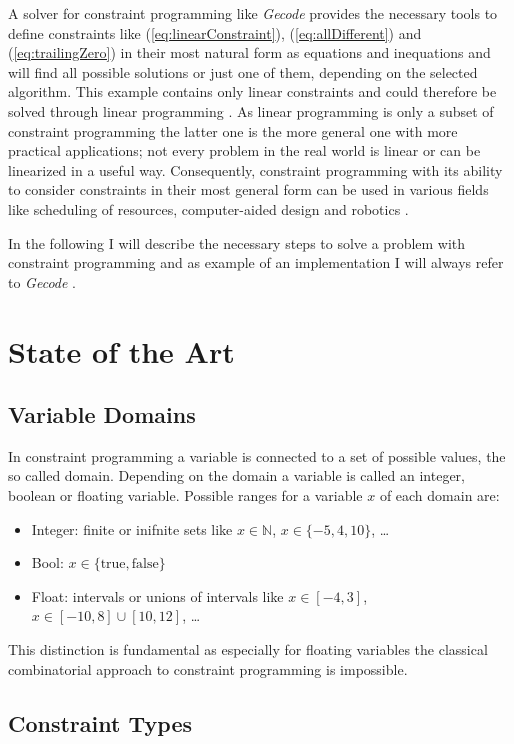 \documentclass[10pt,
               a4paper,
               journal,
               ]{IEEEtran}
\newcommand{\refeq}[1]{{(\ref{#1})}}
\begin{document}
	A solver for constraint programming like \emph{Gecode} provides the necessary tools to define constraints like \refeq{eq:linearConstraint}, \refeq{eq:allDifferent} and \refeq{eq:trailingZero} in their most natural form as equations and inequations and will find all possible solutions or just one of them, depending on the selected algorithm. This example contains only linear constraints and could therefore be solved through linear programming \cite[1]{linearProgramming}. As linear programming is only a subset of constraint programming the latter one is the more general one with more practical applications; not every problem in the real world is linear or can be linearized in a useful way. Consequently, constraint programming with its ability to consider constraints in their most general form can be used in various fields like scheduling of resources, computer-aided design and robotics \cite[p.~221]{trendsInCP}.
	
	In the following I will describe the necessary steps to solve a problem with constraint programming and as example of an implementation I will always refer to \emph{Gecode} \cite{gecode}.
	
	\section{State of the Art}
	\subsection{Variable Domains}
	In constraint programming a variable is connected to a set of possible values, the so called domain. Depending on the domain a variable is called an integer, boolean or floating variable. Possible ranges for a variable $x$ of each domain are:
	\begin{itemize}
		\item Integer: finite or inifnite sets like $x \in \mathbb{N}$, $x \in \{-5, 4, 10\}$, \dots
		\item Bool: $x \in \{\text{true}, \text{false}\}$
		\item Float: intervals or unions of intervals like $x \in [-4, 3]$, $x \in [-10, 8] \cup [10, 12]$, \dots
	\end{itemize}
	This distinction is fundamental as especially for floating variables the classical combinatorial approach to constraint programming is impossible.
	
	\subsection{Constraint Types}
	
\end{document}
